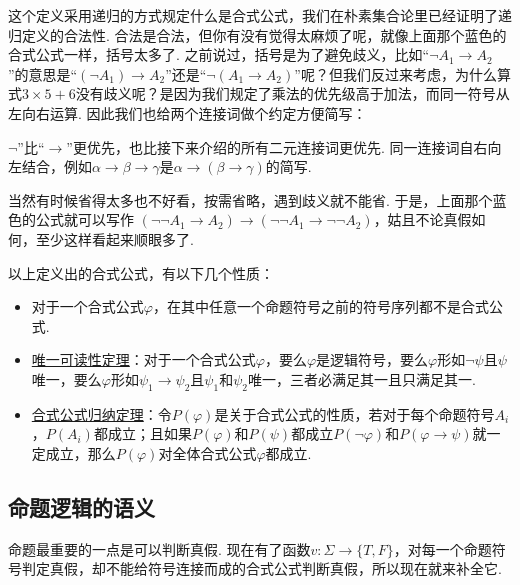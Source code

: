 这个定义采用递归的方式规定什么是合式公式，我们在朴素集合论里已经证明了递归定义的合法性. 合法是合法，但你有没有觉得太麻烦了呢，就像上面那个蓝色的合式公式一样，括号太多了. 之前说过，括号是为了避免歧义，比如“\(\neg A_1 \to A_2\)”的意思是“\((\neg A_1) \to A_2\)”还是“\(\neg (A_1 \to A_2)\)”呢？但我们反过来考虑，为什么算式\(3\times 5+6\)没有歧义呢？是因为我们规定了乘法的优先级高于加法，而同一符号从左向右运算. 因此我们也给两个连接词做个约定方便简写：
\begin{reference}
    \(\neg\)”比“\(\to\)”更优先，也比接下来介绍的所有二元连接词更优先. \newline
    同一连接词自右向左结合，例如\(\alpha \to \beta \to \gamma\)是\(\alpha\to(\beta\to\gamma)\)的简写.
\end{reference}
当然有时候省得太多也不好看，按需省略，遇到歧义就不能省. 于是，上面那个蓝色的公式就可以写作{\color{blue} \((\neg\neg A_1 \to A_2) \to (\neg\neg A_1 \to \neg\neg A_2)\)}，姑且不论真假如何，至少这样看起来顺眼多了.

以上定义出的合式公式，有以下几个性质：
\begin{itemize}
    \item 对于一个合式公式\(\varphi\)，在其中任意一个命题符号之前的符号序列都不是合式公式.
    \item \underline{唯一可读性定理}：对于一个合式公式\(\varphi\)，要么\(\varphi\)是逻辑符号，要么\(\varphi\)形如\(\neg \psi\)且\(\psi\)唯一，要么\(\varphi\)形如\(\psi_1 \to \psi_2\)且\(\psi_1\)和\(\psi_2\)唯一，三者必满足其一且只满足其一.
    \item \underline{合式公式归纳定理}：令\(P(\varphi)\)是关于合式公式的性质，若对于每个命题符号\(A_i\)，\(P(A_i)\)都成立；且如果\(P(\varphi)\)和\(P(\psi)\)都成立\(P(\neg\varphi)\)和\(P(\varphi \to \psi)\)就一定成立，那么\(P(\varphi)\)对全体合式公式\(\varphi\)都成立.
\end{itemize}


\subsection{命题逻辑的语义}

命题最重要的一点是可以判断真假. 现在有了函数\(v: \Sigma \to \{T, F\}\)，对每一个命题符号判定真假，却不能给符号连接而成的合式公式判断真假，所以现在就来补全它.


